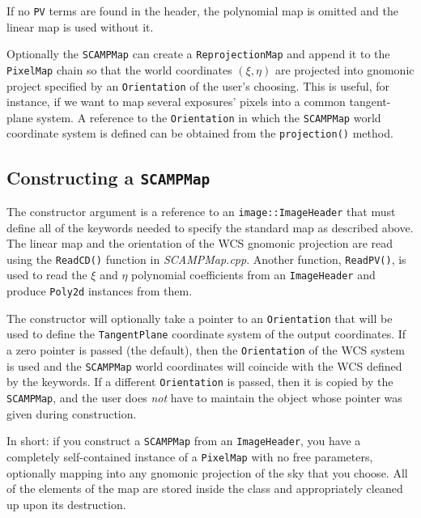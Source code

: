 \documentclass[11pt,preprint,flushrt]{aastex}
\begin{document}
If no {\tt PV} terms are found in the header, the polynomial map is omitted and the linear map is used without it.

Optionally the {\tt SCAMPMap} can create a {\tt ReprojectionMap} and append it to the {\tt PixelMap} chain so that the world coordinates $(\xi,\eta)$ are projected into gnomonic project specified by an {\tt Orientation} of the user's choosing.  This is useful, for instance, if we want to map several exposures' pixels into a common tangent-plane system.  A reference to the {\tt Orientation} in which the {\tt SCAMPMap} world coordinate system is defined can be obtained from the {\tt projection()} method.

\subsection{Constructing a {\tt SCAMPMap}}
The constructor argument is a reference to an {\tt image::ImageHeader} that must define all of the keywords needed to specify the standard map as described above.  The linear map and the orientation of the WCS gnomonic projection are read using the {\tt ReadCD()} function in {\it SCAMPMap.cpp}.  Another function, {\tt ReadPV()}, is used to read the $\xi$ and $\eta$ polynomial coefficients from an {\tt ImageHeader} and produce {\tt Poly2d} instances from them.

The constructor will optionally take a pointer to an {\tt Orientation} that will be used to define the {\tt TangentPlane} coordinate system of the output coordinates.  If a zero pointer is passed (the default), then the {\tt Orientation} of the WCS system is used and the {\tt SCAMPMap} world coordinates will coincide with the WCS defined by the keywords.  If a different {\tt Orientation} is passed, then it is copied by the {\tt SCAMPMap}, and the user does {\em not} have to maintain the object whose pointer was given during construction.

In short: if you construct a {\tt SCAMPMap} from an {\tt ImageHeader}, you have a completely self-contained instance of a {\tt PixelMap} with no free parameters, optionally mapping into any gnomonic projection of the sky that you choose.  All of the elements of the map are stored inside the class and appropriately cleaned up upon its destruction.
\end{document}

